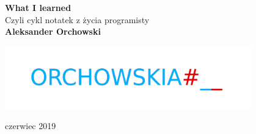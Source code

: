 	\begin{titlepage}
		\begin{center}
			\vspace*{1cm}
{\Huge
			\textbf{What I learned} \\
}			
			\vspace{0.5cm}
{\huge
			Czyli cykl notatek z życia programisty	\\		
}			
			\fontsize{11}{0}
 			\vspace{1.5cm}
{\large
			\textbf{Aleksander Orchowski}
}\\
			\vfill

			\includegraphics[width=0.8\textwidth]{orchowskia}
			\vfill
			
			


			
			\vspace{0.8cm}				

			czerwiec 2019
			
		\end{center}
	\end{titlepage}

